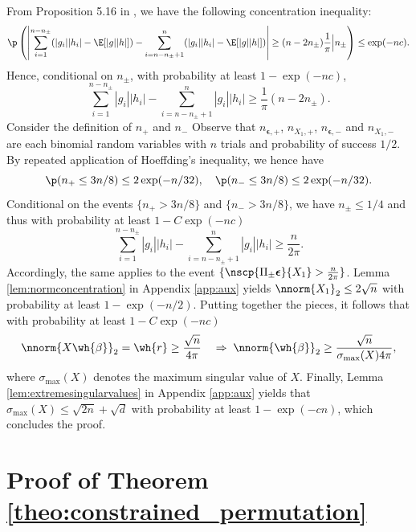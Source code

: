 \documentclass[11pt]{article}
\def\eps{\boldsymbol{\epsilon}}
\begin{document}
From Proposition 5.16 in \cite{Vershynin2010}, we have the following concentration inequality: 
\begin{equation*}  
\p \left(\left|\sum_{i = 1}^{n - n_{\pm}} (|g_i| |h_i| - \E[|g||h|]) - \sum_{i=n - n_{\pm} + 1}^{n} (|g_i| |h_i| - \E[|g||h|]) \right| \geq 
(n - 2 n_{\pm}) \frac{1}{\pi} \Big| n_{\pm} \right) \leq \exp(-n c).
\end{equation*}
Hence, conditional on $n_{\pm}$, with probability at least $1 - \exp(-nc)$, 
\begin{equation*}
\sum_{i = 1}^{n - n_{\pm}} |g_i| |h_i|  - \sum_{i=n - n_{\pm} + 1}^{n} |g_i| |h_i|  \geq \frac{1}{\pi} (n - 2 n_{\pm}). 
\end{equation*}
Consider the definition of $n_+$ and $n_-$ Observe that $n_{\eps, +}$, $n_{X_1, +}$, $n_{\eps, -}$ and $n_{X_1, -}$ are each binomial random variables with $n$ trials and probability of success $1/2$. By repeated application of Hoeffding's inequality, we hence have 
\begin{equation*} 
\p(n_{+} \leq 3n/8) \leq 2\exp(-n/32), \quad \p(n_{-} \leq 3n/8) \leq 2 \exp(-n/32).
\end{equation*}
Conditional on the events $\{ n_{+} > 3n/8\}$ and $\{ n_{-} > 3n/8\}$, we have $n_{\pm} \leq 1/4$ and thus with probability at least $1 - C \exp(-nc)$
\begin{equation*}
\sum_{i = 1}^{n - n_{\pm}} |g_i| |h_i|  - \sum_{i=n - n_{\pm} + 1}^{n} |g_i| |h_i|  \geq \frac{n}{2\pi} . 
\end{equation*}
Accordingly, the same applies to the event $\{ \nscp{\Pi_{\pm} \eps}{X_1} > \frac{n}{2\pi} \}$. 
Lemma \ref{lem:normconcentration} in Appendix \ref{app:aux} yields $\nnorm{X_1}_2 \leq 2 \sqrt{n}$ with probability at least $1 - \exp(-n/2)$. Putting together the pieces, it follows that with probability at least $1 - C \exp(-nc)$
\begin{equation*}
\nnorm{X \wh{\beta}}_2 = \wh{r} \geq \frac{\sqrt{n}}{4\pi} \quad \Rightarrow \; \nnorm{\wh{\beta}}_2 \geq  \frac{\sqrt{n}}{\sigma_{\max}(X) 4\pi},
\end{equation*}   
where $\sigma_{\max}(X)$ denotes the maximum singular value of $X$. Finally, Lemma \ref{lem:extremesingularvalues} in Appendix \ref{app:aux} yields that $\sigma_{\max}(X) \leq \sqrt{2n} + \sqrt{d}$ with probability at least $1 - \exp(-c n)$, which concludes the proof. 


\section{Proof of Theorem \ref{theo:constrained_permutation}}\label{app:theo:constrained_permutation}
\end{document}
